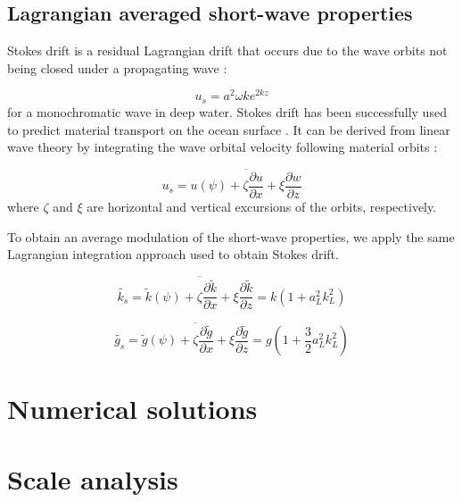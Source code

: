 \documentclass[draft]{agujournal2019}
\begin{document}
\subsection{Lagrangian averaged short-wave properties}

Stokes drift is a residual Lagrangian drift that occurs due to the wave orbits
not being closed under a propagating wave
\cite{stokes1847,kenyon1969stokes,van2018stokes}:

\begin{equation}
\label{}
u_s = a^2 \omega k e^{2kz}
\end{equation}
for a monochromatic wave in deep water.
Stokes drift has been successfully used to predict material transport on the
ocean surface \cite{rohrs2012observation,curcic2016hurricane}.
It can be derived from linear wave theory by integrating the wave orbital
velocity following material orbits \cite{phillips1966dynamics}:

\begin{equation}
\label{eq:lagrangian_average}
u_s = \overline{
  u(\psi) + 
  \zeta \dfrac{\partial u}{\partial x} +
  \xi \dfrac{\partial w}{\partial z}
}
\end{equation}
where $\zeta$ and $\xi$ are horizontal and vertical excursions of the orbits,
respectively.

To obtain an average modulation of the short-wave properties, we apply the same
Lagrangian integration approach used to obtain Stokes drift.

\begin{equation}
\label{eq:stokes_wavenumber}
\widetilde{k_s} = \overline{
  \widetilde{k}(\psi) +
  \zeta \dfrac{\partial \widetilde{k}}{\partial x} +
  \xi \dfrac{\partial \widetilde{k}}{\partial z}
}
= k \left( 1 + a_L^2 k_L^2 \right)
\end{equation}

\begin{equation}
\label{eq:stokes_gravity}
\widetilde{g_s} = \overline{
  \widetilde{g}(\psi) +
  \zeta \dfrac{\partial \widetilde{g}}{\partial x} +
  \xi \dfrac{\partial \widetilde{g}}{\partial z}
}
= g \left( 1 + \dfrac{3}{2} a_L^2 k_L^2 \right)
\end{equation}

\section{Numerical solutions}
\label{section:numerical_solutions}

\section{Scale analysis}
\label{section:scale_analysis}
\end{document}
